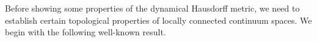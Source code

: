 \documentclass[sn-mathphys-num]{sn-jnl}%
\theoremstyle{thmstyleone}%
\newtheorem{proposition}{Proposition}%
\theoremstyle{thmstyletwo}%
\newtheorem{remark}{Remark}%
\theoremstyle{thmstylethree}%
\newcommand*\induce[1]{#1_\mathcal{K}}
\newcommand*\hyp[1]{\mathcal{#1}}
\begin{document}



Before showing some properties of the dynamical Hausdorff metric, we need to establish certain topological properties of locally connected continuum spaces. We begin with the following well-known result.\\
\end{document}
